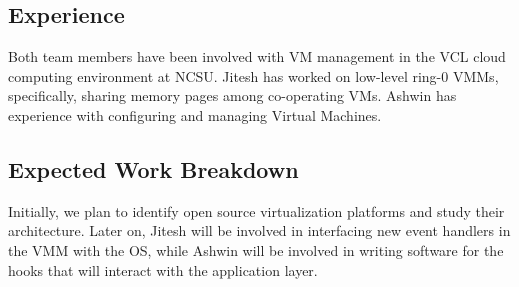 \documentclass[11pt,pdftex]{article}
\begin{document}
\subsection{Experience}
Both team members have been involved with VM management in the VCL cloud computing environment at NCSU. Jitesh has worked on low-level ring-0 VMMs, specifically, sharing memory pages among co-operating VMs. Ashwin has experience with configuring and managing Virtual Machines.

\subsection{Expected Work Breakdown}
Initially, we plan to identify open source virtualization platforms and study their architecture. Later on, Jitesh will be involved in interfacing new event handlers in the VMM with the OS, while Ashwin will be involved in writing software for the hooks that will interact with the application layer.
\end{document}
